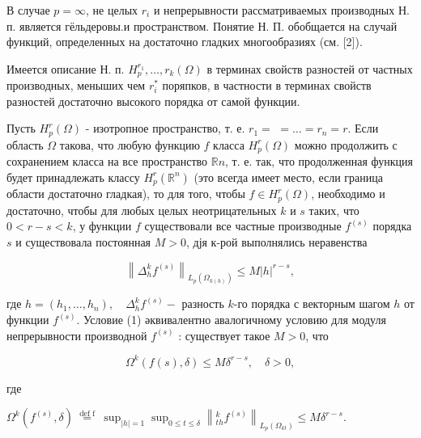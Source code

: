 \documentclass[10pt]{article}
\begin{document}
В случае $p=\infty$, не целых $r_{i}$ и непрерывности рассматриваемых производных Н. п. является гёльдеровы.и пространством. Понятие Н. П. обобщается на случай функций, определенных на достаточно гладких многообразиях (см. [2]).



Имеется описание Н. п. $H_{p}^{r_{1}}, \ldots, r_{k}(\Omega)$ в терминах свойств разностей от частных производных, меныших чем $r_{i}^{*}$ поряпков, в частности в терминах свойств разностей достаточно высокого порядка от самой функции.



Пусть $H_{p}^{r}(\Omega)$ - изотропное пространство, т. е. $r_{1}=$ $=\ldots=r_{n}=r$. Если область $\Omega$ такова, что любую функцию $f$ класса $H_{p}^{r}(\Omega)$ можно продолжить с сохранением класса на все пространство $\mathbb{R} n$, т. е. так, что продолженная функция будет принадлежать классу $H_{p}^{r}\left(\mathbb{R}^{n}\right)$ (это всегда имеет место, если граница области достаточно гладкая), то для того, чтобы $f \in H_{p}^{r}(\Omega)$, необходимо и достаточно, чтобы для любых целых неотрицательных $k$ и $s$ таких, что $0<r-s<k$, у функции $f$ существовали все частные производные $f^{(s)}$ порядка $s$ и существовала постоянная $M>0$, дјя к-рой выполнялись неравенства



\[

\left\|\Delta_{h}^{k} f^{(s)}\right\|_{L_{p}\left(\Omega_{k(h)}\right)} \leqslant M|h|^{r-s},

\]



где $h=\left(h_{1}, \ldots, h_{n}\right), \quad \Delta_{h}^{k} f^{(s)}-$ разность $k$-го порядка с векторным шагом $h$ от функции $f^{(s)}$. Условие (1) әквивалентно авалогичному условию для модуля непрерывности производной $f^{(s)}$ : существует такое $M>0$, что



\[

\Omega^{k}(f(s), \delta) \leqslant M \delta^{r-s}, \quad \delta>0,

\]



где



$\Omega^{k}\left(f^{(s)}, \delta\right) \stackrel{\text { def f }}{=} \sup _{|h|=1} \sup _{0 \leqslant t \leqslant \delta}\left\|_{t h}^{k} f^{(s)}\right\|_{L_{p}\left(\Omega_{k t}\right)} \leqslant M \delta^{r-s}$.
\end{document}
